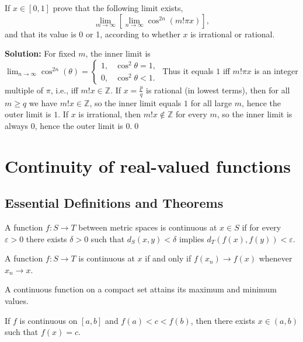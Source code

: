 \begin{problembox}
If \( x \in [0, 1] \) prove that the following limit exists,
\[\lim_{m \to \infty} \left[ \lim_{n \to \infty} \cos^{2n} (m! \pi x) \right],\]
and that its value is 0 or 1, according to whether \( x \) is irrational or rational.
\end{problembox}

\noindent\textbf{Solution:}
For fixed $m$, the inner limit is $\lim_{n\to\infty}\cos^{2n}(\theta)=\begin{cases}1,& \cos^2\theta=1,\\ 0,& \cos^2\theta<1.\end{cases}$ Thus it equals $1$ iff $m!\pi x$ is an integer multiple of $\pi$, i.e., iff $m!x\in\mathbb{Z}$. If $x=\tfrac{p}{q}$ is rational (in lowest terms), then for all $m\ge q$ we have $m!x\in\mathbb{Z}$, so the inner limit equals $1$ for all large $m$, hence the outer limit is $1$. If $x$ is irrational, then $m!x\notin\mathbb{Z}$ for every $m$, so the inner limit is always $0$, hence the outer limit is $0$.\qed

\section{Continuity of real-valued functions}

\subsection*{Essential Definitions and Theorems}

\begin{definition}
A function $f: S \to T$ between metric spaces is continuous at $x \in S$ if for every $\varepsilon > 0$ there exists $\delta > 0$ such that $d_S(x,y) < \delta$ implies $d_T(f(x), f(y)) < \varepsilon$.
\end{definition}

\begin{theorem}
A function $f: S \to T$ is continuous at $x$ if and only if $f(x_n) \to f(x)$ whenever $x_n \to x$.
\end{theorem}

\begin{theorem}
A continuous function on a compact set attains its maximum and minimum values.
\end{theorem}

\begin{theorem}
If $f$ is continuous on $[a,b]$ and $f(a) < c < f(b)$, then there exists $x \in (a,b)$ such that $f(x) = c$.
\end{theorem}




